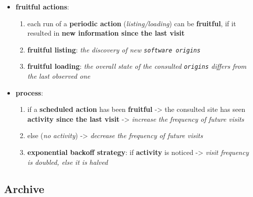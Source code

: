 \documentclass[11pt]{article}
\providecommand{\tightlist}{%
      \setlength{\itemsep}{0pt}\setlength{\parskip}{0pt}}
\begin{document}
\begin{enumerate}
  \begin{itemize}
  \tightlist
  \item
    \textbf{fruitful actions}:

    \begin{enumerate}
    \def\labelenumii{\arabic{enumii}.}
    \tightlist
    \item
      each run of a \textbf{periodic action} (\emph{listing/loading})
      can be \textbf{fruitful}, if it resulted in \textbf{new
      information since the last visit}
    \item
      \textbf{fruitful listing}: \emph{the discovery of new
      \texttt{software\ origins}}
    \item
      \textbf{fruitful loading}: \emph{the overall state of the
      consulted \texttt{origins} differs from the last observed one}
    \end{enumerate}
  \item
    \textbf{process}:

    \begin{enumerate}
    \def\labelenumii{\arabic{enumii}.}
    \tightlist
    \item
      if a \textbf{scheduled action} has been \textbf{fruitful}
      -\textgreater{} the consulted site has seen \textbf{activity since
      the last visit} -\textgreater{} \emph{increase the frequency of
      future visits}
    \item
      else (\emph{no activity}) -\textgreater{} \emph{decrease the
      frequency of future visits}
    \item
      \textbf{exponential backoff strategy}: if \textbf{activity} is
      noticed -\textgreater{} \emph{visit frequency is doubled, else it
      is halved}
    \end{enumerate}
  \end{itemize}
\end{enumerate}

\hypertarget{archive}{%
\subsection{Archive}\label{archive}}
\end{document}
